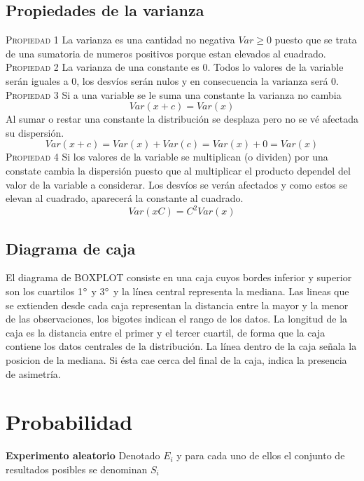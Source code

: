 \documentclass[10pt,a4paper]{article}
\begin{document}
\subsection{Propiedades de la varianza}
\textsc{Propiedad 1} La varianza es una cantidad no negativa $Var\geq 0$ puesto que se trata de una sumatoria de numeros positivos porque estan elevados al cuadrado.\\
\textsc{Propiedad 2} La varianza de una constante es 0. Todos lo valores de la variable serán iguales a 0, los desvíos serán nulos y en consecuencia la varianza será 0.\\
\textsc{Propiedad 3} Si a una variable se le suma una constante la varianza no cambia
\begin{equation}
	Var(x+c)=Var(x)
\end{equation}
Al sumar o restar una constante la distribución se desplaza pero no se vé afectada su dispersión.
\begin{equation}
	Var(x+c)=Var(x)+Var(c)=Var(x)+0=Var(x)
\end{equation}
\textsc{Propiedad 4} Si los valores de la variable se multiplican (o dividen) por una constate cambia la dispersión puesto que al multiplicar el producto dependel del valor de la variable a considerar. Los desvíos se verán afectados y como estos se elevan al cuadrado, aparecerá la constante al cuadrado.
\begin{equation}
	Var(xC)=C^2Var(x)
\end{equation}

\subsection{Diagrama de caja}
El diagrama de BOXPLOT consiste en una caja cuyos bordes inferior y superior son los cuartilos 1$\degree$ y 3$\degree$ y la línea central representa la mediana. Las lineas que se extienden desde cada caja representan la distancia entre la mayor y la menor de las observaciones, los bigotes indican el rango de los datos. La longitud de la caja es la distancia entre el primer y el tercer cuartil, de forma que la caja contiene los datos centrales de la distribución. La línea dentro de la caja señala la posicion de la mediana. Si ésta cae cerca del final de la caja, indica la presencia de asimetría.

\section{Probabilidad}
\textbf{Experimento aleatorio} Denotado $E_i$ y para cada uno de ellos el conjunto de resultados posibles se denominan $S_i$\\
\end{document}
